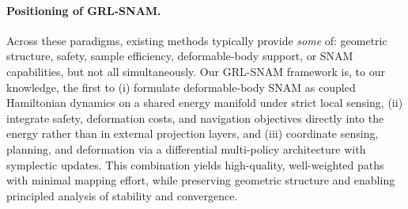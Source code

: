 \paragraph{Positioning of GRL-SNAM.}
Across these paradigms, existing methods typically provide \emph{some} of: geometric structure, safety, sample efficiency, deformable-body support, or SNAM capabilities, but not all simultaneously. Our GRL-SNAM framework is, to our knowledge, the first to (i) formulate deformable-body SNAM as coupled Hamiltonian dynamics on a shared energy manifold under strict local sensing, (ii) integrate safety, deformation costs, and navigation objectives directly into the energy rather than in external projection layers, and (iii) coordinate sensing, planning, and deformation via a differential multi-policy architecture with symplectic updates. This combination yields high-quality, well-weighted paths with minimal mapping effort, while preserving geometric structure and enabling principled analysis of stability and convergence.